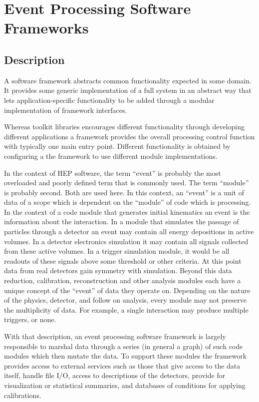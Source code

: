 \section{Event Processing Software Frameworks}

\subsection{Description}

A software framework abstracts common functionality expected in some
domain.  It provides some generic implementation of a full system in
an abstract way that lets application-specific functionality to be
added through a modular implementation of framework interfaces.

Whereas toolkit libraries encourages different functionality through
developing different applications a framework provides the overall
processing control function with typically one main entry point.
Different functionality is obtained by configuring a the framework to
use different module implementations.

In the context of HEP software, the term ``event'' is probably the
most overloaded and poorly defined term that is commonly used.  The
term ``module'' is probably second.  Both are used here.  In this
context, an ``event'' is a unit of data of a scope which is dependent
on the ``module'' of code which is processing.  In the context of a
code module that generates initial kinematics an event is the
information about the interaction.  In a module that simulates the
passage of particles through a detector an event may contain all
energy depositions in active volumes.  In a detector electronics
simulation it may contain all signals collected from these active
volumes.  In a trigger simulation module, it would be all readouts of
these signals above some threshold or other criteria.  At this point
data from real detectors gain symmetry with simulation.  Beyond this
data reduction, calibration, reconstruction and other analysis modules
each have a unique concept of the ``event'' of data they operate on.
Depending on the nature of the physics, detector, and follow on
analysis, every module may not preserve the multiplicity of data.  For
example, a single interaction may produce multiple triggers, or none.

With that description, an event processing software framework is
largely responsible to marshal data through a series (in general a
graph) of such code modules which then mutate the data.  To support
these modules the framework provides access to external services such
as those that give access to the data itself, handle file I/O, access
to descriptions of the detectors, provide for visualization or
statistical summaries, and databases of conditions for applying
calibrations.

